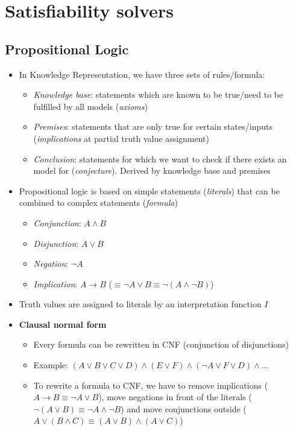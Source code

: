 \section{Satisfiability solvers}
\subsection{Propositional Logic}
\begin{itemize}
	\item In Knowledge Representation, we have three sets of rules/formula:
	\begin{itemize}
		\item \textit{Knowledge base}: statements which are known to be true/need to be fulfilled by all models (\textit{axioms})
		\item \textit{Premises}: statements that are only true for certain states/inputs (\textit{implications} at partial truth value assignment)
		\item \textit{Conclusion}: statements for which we want to check if there exists an model for (\textit{conjecture}). Derived by knowledge base and premises
	\end{itemize} 
	\item Propositional logic is based on simple statements (\textit{literals}) that can be combined to complex statements (\textit{formula})
	\begin{itemize}
		\item \textit{Conjunction}: $A\wedge B$
		\item \textit{Disjunction}: $A\vee B$
		\item \textit{Negation}: $\lnot A$
		\item \textit{Implication}: $A\to B$ ($\equiv\lnot A \vee B\equiv \lnot (A \wedge \lnot B)$)
	\end{itemize}
	\item Truth values are assigned to literals by an interpretation function $I$
	\item \textbf{Clausal normal form}
	\begin{itemize}
		\item Every formula can be rewritten in CNF (conjunction of disjunctions)
		\item Example: $(A\vee B\vee C\vee D)\wedge(E\vee F)\wedge(\lnot A \vee F \vee D)\wedge ...$
		\item To rewrite a formula to CNF, we have to remove implications ($A\to B \equiv\lnot A \vee B$), move negations in front of the literals ($\lnot (A\vee B) \equiv \lnot A \wedge \lnot B$) and move conjunctions outside ($A \vee (B\wedge C) \equiv (A\vee B)\wedge (A \vee C)$) 

\end{itemize}
\end{itemize}
